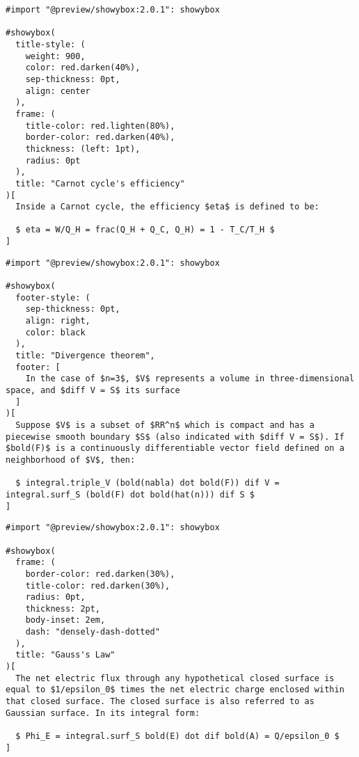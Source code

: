 \pandocbounded{}

\begin{verbatim}
#import "@preview/showybox:2.0.1": showybox

#showybox(
  title-style: (
    weight: 900,
    color: red.darken(40%),
    sep-thickness: 0pt,
    align: center
  ),
  frame: (
    title-color: red.lighten(80%),
    border-color: red.darken(40%),
    thickness: (left: 1pt),
    radius: 0pt
  ),
  title: "Carnot cycle's efficiency"
)[
  Inside a Carnot cycle, the efficiency $eta$ is defined to be:

  $ eta = W/Q_H = frac(Q_H + Q_C, Q_H) = 1 - T_C/T_H $
]
\end{verbatim}

\pandocbounded{}

\begin{verbatim}
#import "@preview/showybox:2.0.1": showybox

#showybox(
  footer-style: (
    sep-thickness: 0pt,
    align: right,
    color: black
  ),
  title: "Divergence theorem",
  footer: [
    In the case of $n=3$, $V$ represents a volume in three-dimensional space, and $diff V = S$ its surface
  ]
)[
  Suppose $V$ is a subset of $RR^n$ which is compact and has a piecewise smooth boundary $S$ (also indicated with $diff V = S$). If $bold(F)$ is a continuously differentiable vector field defined on a neighborhood of $V$, then:

  $ integral.triple_V (bold(nabla) dot bold(F)) dif V = integral.surf_S (bold(F) dot bold(hat(n))) dif S $
]
\end{verbatim}

\pandocbounded{}

\begin{verbatim}
#import "@preview/showybox:2.0.1": showybox

#showybox(
  frame: (
    border-color: red.darken(30%),
    title-color: red.darken(30%),
    radius: 0pt,
    thickness: 2pt,
    body-inset: 2em,
    dash: "densely-dash-dotted"
  ),
  title: "Gauss's Law"
)[
  The net electric flux through any hypothetical closed surface is equal to $1/epsilon_0$ times the net electric charge enclosed within that closed surface. The closed surface is also referred to as Gaussian surface. In its integral form:

  $ Phi_E = integral.surf_S bold(E) dot dif bold(A) = Q/epsilon_0 $
]
\end{verbatim}

